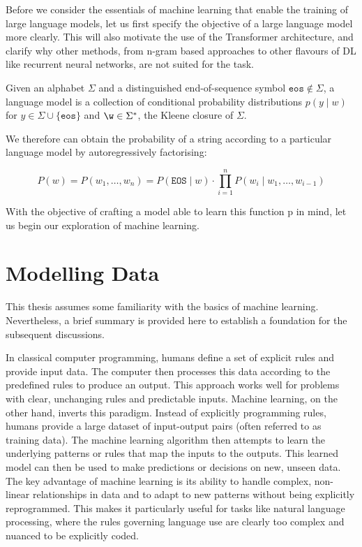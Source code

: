\documentclass[a4paper, oneside]{discothesis}
\begin{document}
Before we consider the essentials of machine learning that enable the training of large language models, let us first specify the objective of a large language model more clearly. 
This will also motivate the use of the Transformer architecture, and clarify why other methods, from n-gram based approaches to other flavours of DL like recurrent neural networks, are not suited for the task.

\begin{theorem} \label{thm:first theorem}
    Given an alphabet $\Sigma$ and a distinguished end-of-sequence symbol $\texttt{eos} \notin \Sigma$, a
    language model is a collection of conditional probability distributions $p(y \mid w)$ for $y \in \Sigma \cup \{\texttt{eos}\}$ and $\w \in \Sigma^*$,
    the Kleene closure of $\Sigma$.
\end{theorem}

We therefore can obtain the probability of a string according to a particular language model by autoregressively factorising:

\begin{equation}
    P(w) = P(w_1, \ldots, w_n) =  P(\texttt{EOS} \mid w) \cdot \prod_{i=1}^n P(w_i \mid w_1, \ldots, w_{i-1}) 
\end{equation}

With the objective of crafting a model able to learn this function p in mind, let us begin our exploration of machine learning. 

\section{Modelling Data}

This thesis assumes some familiarity with the basics of machine learning. Nevertheless, a brief summary is provided here to establish a foundation for the subsequent discussions.

In classical computer programming, humans define a set of explicit rules and provide input data. The computer then processes this data according to the predefined rules to produce an output. 
This approach works well for problems with clear, unchanging rules and predictable inputs.
Machine learning, on the other hand, inverts this paradigm. Instead of explicitly programming rules, humans provide a large dataset of input-output pairs (often referred to as training data). 
The machine learning algorithm then attempts to learn the underlying patterns or rules that map the inputs to the outputs. 
This learned model can then be used to make predictions or decisions on new, unseen data.
The key advantage of machine learning is its ability to handle complex, non-linear relationships in data and to adapt to new patterns without being explicitly reprogrammed. 
This makes it particularly useful for tasks like natural language processing, where the rules governing language use are clearly too complex and nuanced to be explicitly coded.
\end{document}
